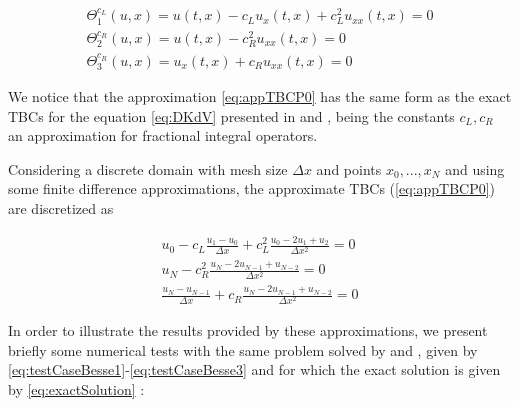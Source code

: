 
\begin{equation}
  \label{eq:appTBCP0}
    \begin{gathered}
        \Theta_1^{c_L}(u,x) = u(t,x) - c_L u_x(t,x)  + c_L^2  u_{xx}(t,x) = 0 \\
        \Theta_2^{c_R}(u,x) =  u(t,x) - c_R^2    u_{xx}(t,x) = 0\\
        \Theta_3^{c_R} (u,x)= u_x(t,x) + c_R u_{xx}(t,x)  = 0
    \end{gathered}
\end{equation}

\indent We notice that the approximation \eqref{eq:appTBCP0} has the same form as the exact TBCs for the equation \eqref{eq:DKdV} presented in \cite{zheng2008} and \cite{besse2015}, being the constants $c_L,c_R$ an approximation for fractional integral operators. 

\indent Considering a discrete domain with mesh size $\Delta x$ and points $x_0, ..., x_N$ and using some finite difference approximations, the approximate TBCs (\ref{eq:appTBCP0}) are discretized as

\begin{equation}
\label{eq:appDiscTBCP0}
    \begin{gathered}
        u_0 - c_L \frac{u_1 - u_0}{\Delta x}  + c_L^2  \frac{u_0 -2u_1 + u_2}{\Delta x^2} = 0 \\
        u_N - c_R^2    \frac{u_N -2u_{N-1} + u_{N-2}}{\Delta x^2} = 0 \\
        \frac{u_N - u_{N-1}}{\Delta x}  + c_R    \frac{u_N -2u_{N-1} + u_{N-2}}{\Delta x^2} = 0 
    \end{gathered}
\end{equation}

\indent In order to illustrate the results provided by these approximations, we present briefly some numerical tests with the same problem solved by \cite{zheng2008} and \cite{besse2015}, given by \eqref{eq:testCaseBesse1}-\eqref{eq:testCaseBesse3} and for which the exact solution is given by \eqref{eq:exactSolution} :

